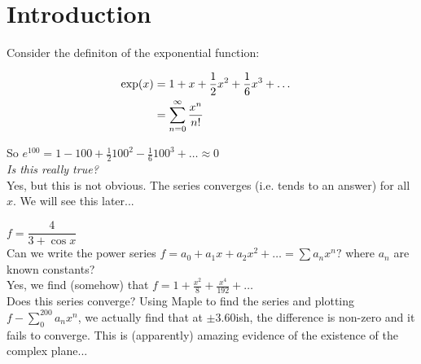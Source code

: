 \documentclass[twoside]{scrartcl}
\begin{document}
\TableofContents



\pagebreak
\setcounter{page}{5}
\section{Introduction}



\begin{example}
Consider the definiton of the exponential function: \vspace{-10pt}

\begin{align} \nonumber
\exp(x) &= 1 + x + \frac{1}{2}x^2 + \frac{1}{6}x^3 + \dots && \vspace*{5pt}\\\nonumber
&= \sum_{n=0}^{\infty} \frac{x^n}{n!} &&
\end{align}

So $e^{100} = 1 - 100 + \frac{1}{2}100^2 - \frac{1}{6}100^3 + \dots \approx 0$\\

\textit{Is this really true?}\\
Yes, but this is not obvious. The series converges (i.e. tends to an answer) for all $x$. We will see this later...
\end{example}\vspace*{5pt}

\begin{example}
$f = \dfrac{4}{3+\cos x}$\\

Can we write the power series $f = a_0 + a_1 x + a_2 x^2 + \dots = \sum a_n x^n?$ where $a_n$ are known constants?\\

Yes, we find (somehow) that $f = 1 + \frac{x^2}{8} + \frac{x^4}{192} + \dots$\\

Does this series converge? Using Maple to find the series and plotting $f - \sum_0^{200} a_n x^n$, we actually find that at $\pm 3.60$ish, the difference is non-zero and it fails to converge. This is (apparently) amazing evidence of the existence of the complex plane...
\end{example}\vspace*{5pt}
\end{document}
